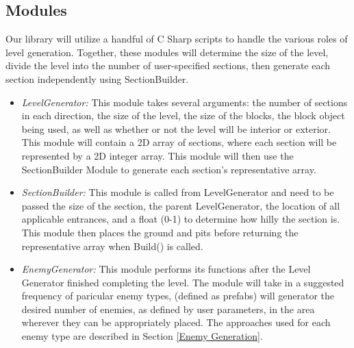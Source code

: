 \documentclass[pdftex,12pt,letter]{article}
\begin{document}
\begin{itemize}
\begin{itemize}
\begin{itemize}
\subsection{Modules}\label{Modules}
Our library will utilize a handful of C Sharp scripts to handle the various roles of level generation. Together, these modules will determine the size of the level, divide the level into the number of user-specified sections, then generate each section independently using SectionBuilder. 
\begin{itemize}

\item \textit{LevelGenerator:} This module takes several arguments: the number of sections in each direction, the size of the level, the size of the blocks, the block object being used, as well as whether or not the level will be interior or exterior. This module will contain a 2D array of sections, where each section will be represented by a 2D integer array. This module will then use the SectionBuilder Module to generate each section's representative array.

\item \textit{SectionBuilder:} This module is called from LevelGenerator and need to be passed the size of the section, the parent LevelGenerator, the location of all applicable entrances, and a float (0-1) to determine how hilly the section is. This module then places the ground and pits before returning the representative array when Build() is called.

\item \textit{EnemyGenerator:} This module performs its functions after the Level Generator finished completing the level. The module will take in a suggested frequency of paricular enemy types, (defined as prefabs) will generator the desired number of enemies, as defined by user parameters, in the area wherever they can be appropriately placed. The approaches used for each enemy type are described in Section \ref{Enemy Generation}.

\endgroup



\end{itemize}
\end{itemize}
\end{itemize}
\end{itemize}
\end{document}
